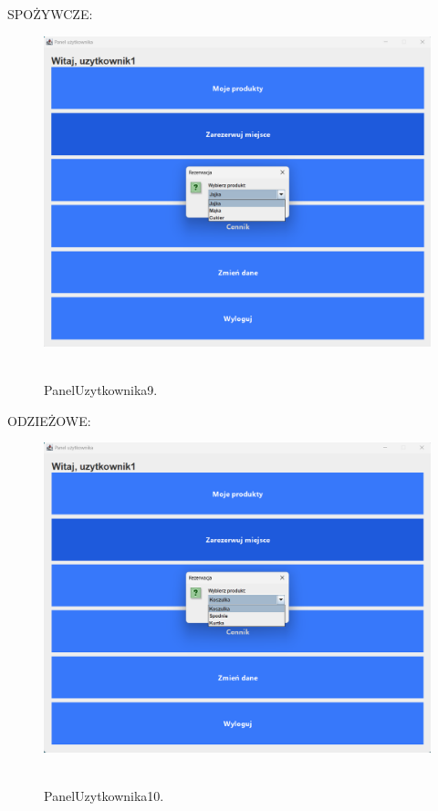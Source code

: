 SPOŻYWCZE:
\begin{figure}[H]
    \centering
    \includegraphics[width=.9\linewidth]{figures/PanelUzytkownika9.png}\
    \caption{PanelUzytkownika9.\label{PanelUzytkownika9}}
\end{figure}

ODZIEŻOWE:
\begin{figure}[H]
    \centering
    \includegraphics[width=.9\linewidth]{figures/PanelUzytkownika10.png}\
    \caption{PanelUzytkownika10.\label{PanelUzytkownika10}}
\end{figure}

